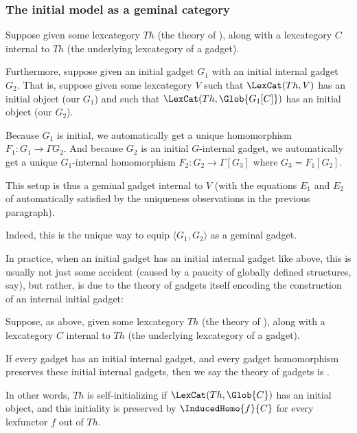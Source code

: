 \subsubsection{The initial model as a geminal category}
\begin{construction}\label{InitoGeminalYieldsGeminal}
Suppose given some lexcategory $Th$ (the theory of ), along with a lexcategory $C$ internal to $Th$ (the underlying lexcategory of a gadget).

Furthermore, suppose given an initial gadget $G_1$ with an initial internal gadget $G_2$. That is, suppose given some lexcategory $V$ such that $\LexCat(Th, V)$ has an initial object (our $G_1$) and such that $\LexCat(Th, \Glob{G_1[C]})$ has an initial object (our $G_2$).

Because $G_1$ is initial, we automatically get a unique homomorphism $F_1 : G_1 \to \Gamma{G_2}$. And because $G_2$ is an initial $G$-internal gadget, we automatically get a unique $G_1$-internal homomorphism $F_2 : G_2 \to \Gamma[G_3]$ where $G_3 = F_1[G_2]$.

This setup is thus a geminal gadget internal to $V$ (with the equations $E_1$ and $E_2$ of  automatically satisfied by the uniqueness observations in the previous paragraph).

Indeed, this is the unique way to equip $\langle G_1, G_2 \rangle$ as a geminal gadget.
\end{construction}

In practice, when an initial gadget has an initial internal gadget like above, this is usually not just some accident (caused by a paucity of globally defined structures, say), but rather, is due to the theory of gadgets itself encoding the construction of an internal initial gadget:
\begin{definition}
Suppose, as above, given some lexcategory $Th$ (the theory of ), along with a lexcategory $C$ internal to $Th$ (the underlying lexcategory of a gadget).

If every gadget has an initial internal gadget, and every gadget homomorphism preserves these initial internal gadgets, then we say the theory of gadgets is .

In other words, $Th$ is self-initializing if $\LexCat(Th, \Glob{C})$ has an initial object, and this initiality is preserved by $\InducedHomo{f}{C}$ for every lexfunctor $f$ out of $Th$.
\end{definition}

